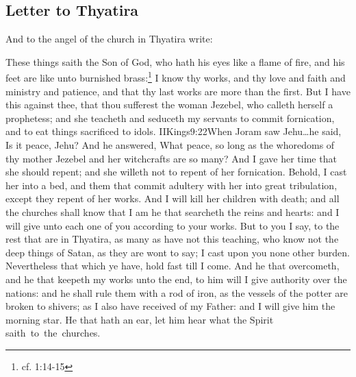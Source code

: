 \subsection*{Letter to Thyatira}
And to the angel of the church in Thyatira write:

These things saith the Son of God, who hath his eyes like a flame of fire, and his feet are like unto burnished brass:\footnote{cf. 1:14-15} %
I know thy works, and thy love and faith and ministry and patience, and that thy last works are more than the first. %
But I have this against thee, that thou sufferest the woman Jezebel, who calleth herself a prophetess; and she teacheth and seduceth my servants to commit fornication, and to eat things sacrificed to idols.%
				 {IIKings}{9:22}{When Joram saw Jehu\ldots he said, Is it peace, Jehu? And he answered, What peace, so long as the whoredoms of thy mother Jezebel and her witchcrafts are so many?}
And I gave her time that she should repent; and she willeth not to repent of her fornication. %
Behold, I cast her into a bed, and them that commit adultery with her into great tribulation, except they repent of her works. %
And I will kill her children with death; and all the churches shall know that I am he that searcheth the reins and hearts:%
 and I will give unto each one of you according to your works. %
But to you I say, to the rest that are in Thyatira, as many as have not this teaching, who know not the deep things of Satan, as they are wont to say; I cast upon you none other burden. %
Nevertheless that which ye have, hold fast till I come. %
And he that overcometh, and he that keepeth my works unto the end, to him will I give authority over the nations: %
and he shall rule them with a rod of iron, as the vessels of the potter are broken to shivers;%
 as I also have received of my Father: %
and I will give him the morning star. %
He that hath an ear, let him hear what the Spirit saith~to~the~churches.
